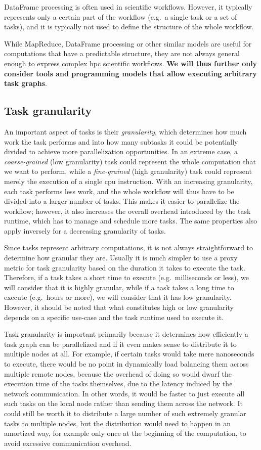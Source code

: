 DataFrame processing is often used in scientific workflows. However, it typically represents only a
certain part of the workflow (e.g.\ a single task or a set of tasks), and it is typically not used
to define the structure of the whole workflow.

While MapReduce, DataFrame processing or other similar models are useful for computations that have
a predictable structure, they are not always general enough to express complex
\gls{hpc} scientific workflows.
\textbf{We will thus further only consider tools and programming models
that allow executing arbitrary task graphs}.

\subsection{Task granularity}
\label{sec:task-granularity}
An important aspect of tasks is their \emph{granularity}, which determines how much work the
task performs and into how many subtasks it could be potentially divided to achieve more
parallelization opportunities. In an extreme case, a \emph{coarse-grained} (low granularity) task could represent
the whole computation that we want to perform, while a \emph{fine-grained} (high granularity) task could represent
merely the execution of a single \gls{cpu} instruction. With an increasing
granularity, each task performs less work, and the whole workflow will thus have to be divided into
a larger number of tasks. This makes it easier to parallelize the workflow; however, it also
increases the overall overhead introduced by the task runtime, which has to manage and schedule
more tasks. The same properties also apply inversely for a decreasing granularity of tasks.

Since tasks represent arbitrary computations, it is not always straightforward to determine how
granular they are. Usually it is much simpler to use a proxy metric for task granularity based on
the duration it takes to execute the task. Therefore, if a task takes a short time to execute (e.g.\
milliseconds or less), we will consider that it is highly granular, while if a task takes a long
time to execute (e.g.\ hours or more), we will consider that it has low granularity. However, it
should be noted that what constitutes high or low granularity depends on a specific use-case and the
task runtime used to execute it.

Task granularity is important primarily because it determines how efficiently a task graph can be
parallelized and if it even makes sense to distribute it to multiple nodes at all. For example, if
certain tasks would take mere nanoseconds to execute, there would be no point in dynamically load
balancing them across multiple remote nodes, because the overhead of doing so would dwarf the
execution time of the tasks themselves, due to the latency induced by the network communication. In
other words, it would be faster to just execute all such tasks on the local node rather than
sending them across the network. It could still be worth it to distribute a large number of such
extremely granular tasks to multiple nodes, but the distribution would need to happen in an
amortized way, for example only once at the beginning of the computation, to avoid excessive
communication overhead.

